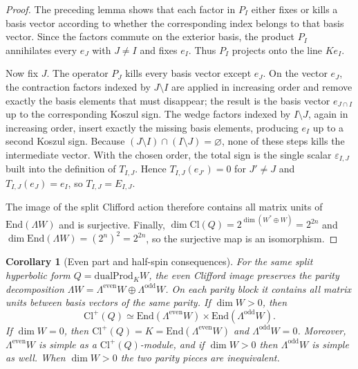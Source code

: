 \documentclass{birkjour}
\theoremstyle{plain}
\newtheorem{corollary}[theorem]{Corollary}
\theoremstyle{definition}
\theoremstyle{remark}
\newcommand{\Cl}{\mathrm{Cl}}
\newcommand{\End}{\mathrm{End}}
\newcommand{\dualProd}{\mathrm{dualProd}}
\newcommand{\wedgeW}{\Lambda W}
\newcommand{\wedgeEven}{\Lambda^{\mathrm{even}} W}
\newcommand{\wedgeOdd}{\Lambda^{\mathrm{odd}} W}
\begin{document}
\begin{proof}
The preceding lemma shows that each factor in $P_I$ either fixes or kills a
basis vector according to whether the corresponding index belongs to that basis
vector. Since the factors commute on the exterior basis, the product $P_I$
annihilates every $e_J$ with $J\neq I$ and fixes $e_I$. Thus $P_I$ projects
onto the line $Ke_I$.

Now fix $J$. The operator $P_J$ kills every basis vector except $e_J$. On the
vector $e_J$, the contraction factors indexed by $J\setminus I$ are applied in
increasing order and remove exactly the basis elements that must disappear; the
result is the basis vector $e_{J\cap I}$ up to the corresponding Koszul sign.
The wedge factors indexed by $I\setminus J$, again in increasing order, insert
exactly the missing basis elements, producing $e_I$ up to a second Koszul sign.
Because $(J\setminus I)\cap(I\setminus J)=\varnothing$, none of these steps
kills the intermediate vector. With the chosen order, the total sign is the
single scalar $\varepsilon_{I,J}$ built into the definition of $T_{I,J}$.
Hence $T_{I,J}(e_{J'})=0$ for $J'\neq J$ and $T_{I,J}(e_J)=e_I$, so
$T_{I,J}=E_{I,J}$.

The image of the split Clifford action therefore contains all matrix units of
$\End(\wedgeW)$ and is surjective. Finally,
$\dim \Cl(Q)=2^{\dim(W^*\oplus W)}=2^{2n}$ and
$\dim \End(\wedgeW)=(2^n)^2=2^{2n}$, so the surjective map is an
isomorphism.
\end{proof}

\begin{corollary}[Even part and half-spin consequences]
\label{cor:even-half-spin}
For the same split hyperbolic form $Q=\dualProd_K W$, the even Clifford image
preserves the parity decomposition
$\wedgeW=\wedgeEven\oplus\wedgeOdd$. On each parity block it contains all
matrix units between basis vectors of the same parity. If $\dim W>0$, then
\[
  \Cl^+(Q)\simeq \End(\wedgeEven)\times \End(\wedgeOdd).
\]
If $\dim W=0$, then $\Cl^+(Q)=K=\End(\wedgeEven)$ and $\wedgeOdd=0$. Moreover,
$\wedgeEven$ is simple as a $\Cl^+(Q)$-module, and if $\dim W>0$ then
$\wedgeOdd$ is simple as well. When $\dim W>0$ the two parity pieces are
inequivalent.
\end{corollary}
\end{document}
